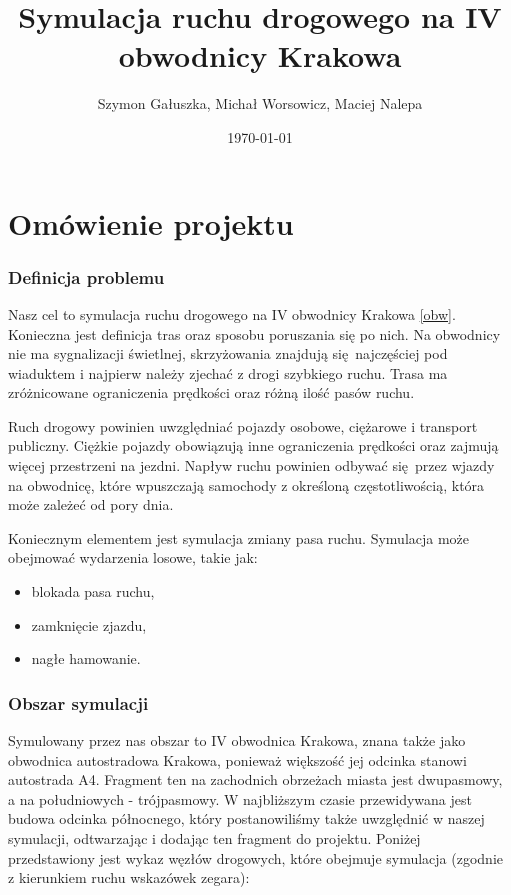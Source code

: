 \documentclass[a4paper,12pt]{article}
\title{Symulacja ruchu drogowego na IV obwodnicy Krakowa}
\author{Szymon Gałuszka, Michał Worsowicz, Maciej Nalepa}
\date{\today}
\begin{document}
    \maketitle

    \part{Omówienie projektu}

	\section{Definicja problemu}
	
	Nasz cel to symulacja ruchu drogowego na IV obwodnicy Krakowa \ref{obw}. 
	Konieczna jest definicja tras oraz sposobu poruszania się po nich.
	Na obwodnicy nie ma sygnalizacji świetlnej, skrzyżowania znajdują się najczęściej pod wiaduktem i najpierw należy zjechać z drogi szybkiego ruchu.
	Trasa ma zróżnicowane ograniczenia prędkości oraz różną ilość pasów ruchu.
	
	Ruch drogowy powinien uwzględniać pojazdy osobowe, ciężarowe i transport publiczny.
	Ciężkie pojazdy obowiązują inne ograniczenia prędkości oraz zajmują więcej przestrzeni na jezdni.
	Napływ ruchu powinien odbywać się przez wjazdy na obwodnicę, które wpuszczają samochody z określoną częstotliwością, która może zależeć od pory dnia.
	
	Koniecznym elementem jest symulacja zmiany pasa ruchu. 
	Symulacja może obejmować wydarzenia losowe, takie jak:
	
	\begin{itemize}
		\item blokada pasa ruchu,
		\item zamknięcie zjazdu,
		\item nagłe hamowanie.
    \end{itemize}
    
    \section{Obszar symulacji}
	Symulowany przez nas obszar to IV obwodnica Krakowa, znana także jako obwodnica autostradowa Krakowa, ponieważ większość jej odcinka stanowi autostrada A4. Fragment ten na zachodnich obrzeżach miasta jest dwupasmowy, a na południowych - trójpasmowy. W najbliższym czasie przewidywana jest budowa odcinka północnego, który postanowiliśmy także uwzględnić w naszej symulacji, odtwarzając i dodając ten fragment do projektu. Poniżej przedstawiony jest wykaz węzłów drogowych, które obejmuje symulacja (zgodnie z kierunkiem ruchu wskazówek zegara):
	
\end{document}

